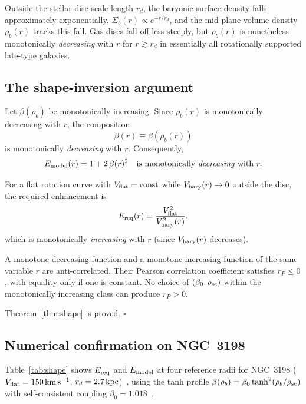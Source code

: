 \documentclass[12pt,a4paper]{article}
\theoremstyle{plain}
\newcommand{\rsc}{\rho_{\rm sc}}
\newcommand{\rhob}{\rho_b}
\newcommand{\Vbary}{V_{\rm bary}}
\newcommand{\Vflat}{V_{\rm flat}}
\begin{document}
Outside the stellar disc scale length $r_d$, the baryonic surface
density falls approximately exponentially, $\Sigma_b(r) \propto e^{-r/r_d}$,
and the mid-plane volume density $\rhob(r)$ tracks this fall.  Gas discs
fall off less steeply, but $\rhob(r)$ is nonetheless monotonically
\emph{decreasing} with $r$ for $r \gtrsim r_d$ in essentially all
rotationally supported late-type galaxies.

\subsection{The shape-inversion argument}
\label{sec:shape_argument}

Let $\beta(\rhob)$ be monotonically increasing.  Since $\rhob(r)$
is monotonically decreasing with $r$, the composition
\begin{equation}
  \beta(r) \equiv \beta(\rhob(r))
\end{equation}
is monotonically \emph{decreasing} with $r$.  Consequently,
\begin{equation}
  E_{\rm model}(r) = 1 + 2\,\beta(r)^2
  \quad \text{is monotonically \emph{decreasing} with } r.
  \label{eq:Emodel_dec}
\end{equation}

For a flat rotation curve with $V_{\rm flat} = {\rm const}$ while
$\Vbary(r) \to 0$ outside the disc, the required enhancement is
\begin{equation}
  E_{\rm req}(r) = \frac{V_{\rm flat}^2}{\Vbary^2(r)},
  \label{eq:Ereq}
\end{equation}
which is monotonically \emph{increasing} with $r$ (since $\Vbary(r)$
decreases).

A monotone-decreasing function and a monotone-increasing function of the
same variable $r$ are anti-correlated.  Their Pearson correlation
coefficient satisfies $r_P \leq 0$, with equality only if one is constant.
No choice of $(\beta_0, \rsc)$ within the monotonically increasing class
can produce $r_P > 0$.

Theorem~\ref{thm:shape} is proved. \qquad $\square$

\subsection{Numerical confirmation on NGC~3198}
\label{sec:shape_num}

Table~\ref{tab:shape} shows $E_{\rm req}$ and $E_{\rm model}$ at four
reference radii for NGC~3198 ($\Vflat = 150\,{\rm km\,s^{-1}}$, $r_d =
2.7\,{\rm kpc}$)~\cite{Lelli2016}, using the tanh profile
$\beta(\rhob) = \beta_0\tanh^2(\rhob/\rsc)$ with self-consistent coupling
$\beta_0 = 1.018$~\cite{WilsonPaperIV}.
\end{document}
